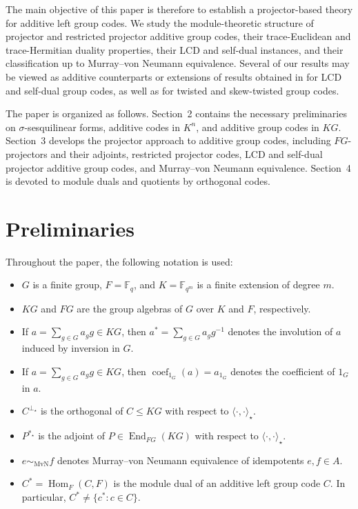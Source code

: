 \documentclass[11pt]{article}
\begin{document}
The main objective of this paper is therefore to establish a projector-based
theory for additive left group codes. We study the module-theoretic structure
of projector and restricted projector additive group codes, their
trace-Euclidean and trace-Hermitian duality properties, their LCD and
self-dual instances, and their classification up to Murray--von Neumann
equivalence. Several of our results may be viewed as additive counterparts or
extensions of results obtained in
\cite{BCFM-2025, BBW24, CruzWillems2017, CruzWillems2025,
DeLaCruzWillems2021, Willems2002} for LCD and self-dual group codes, as well
as for twisted and skew-twisted group codes.

The paper is organized as follows. Section~2 contains the necessary
preliminaries on $\sigma$-sesquilinear forms, additive codes in $K^n$, and
additive group codes in $KG$. Section~3 develops the projector approach to
additive group codes, including $FG$-projectors and their adjoints,
restricted projector codes, LCD and self-dual projector additive group codes,
and Murray--von Neumann equivalence. Section~4 is devoted to module duals and
quotients by orthogonal codes.






\section{Preliminaries}
Throughout the paper, the following notation is used:
\begin{itemize}
    \item $G$ is a finite group, $F=\mathbb{F}_q$, and $K=\mathbb{F}_{q^m}$ is a finite extension of degree $m$.
    \item $KG$ and $FG$ are the group algebras of $G$ over $K$ and $F$, respectively.
    \item If $a=\sum_{g\in G} a_g g\in KG$, then $a^\ast=\sum_{g\in G} a_g g^{-1}$ denotes the involution of $a$ induced by inversion in $G$.
    \item If $a=\sum_{g\in G} a_g g\in KG$, then $\operatorname{coef}_{1_G}(a)=a_{1_G}$ denotes the coefficient of $1_G$ in $a$.
    \item $C^{\perp_\star}$ is the orthogonal of $C \leq KG$ with respect to $\langle\cdot,\cdot\rangle_\star$.
    \item $P^{\ast_\star}$ is the adjoint of $P\in\operatorname{End}_{FG}(KG)$ with respect to $\langle\cdot,\cdot\rangle_\star$.
    \item $e \sim_{\mathrm{MvN}} f$ denotes Murray--von Neumann equivalence of idempotents $e,f \in A$.
    \item $C^*=\operatorname{Hom}_F(C,F)$ is the module dual of an additive left group code $C$. In particular, $C^* \neq \{c^*:c\in C\}$.
    \end{itemize}
\end{document}
